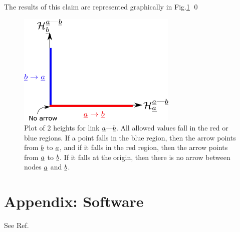 \documentclass[12pt]{article}
\newcommand{\linkab }[0]{{\rva\text{---}\rvb}}
\begin{document}
The results of this claim
are represented graphically in 
Fig.\ref{fig-heights-x-y}
\qed
\begin{figure}[h!]
\centering
\includegraphics[width=3in]
{heights-x-y.png}
\caption{Plot of 2 heights 
for link $\linkab$.
All allowed values 
fall in the
red or blue regions.
If a point falls in
the blue region, then the arrow 
points from ${\underline{b}}$ to ${\underline{a}}$,
and if it falls in the red region,
then
the arrow points from ${\underline{a}}$ to ${\underline{b}}$.
If it falls at the origin, then
there is no arrow between 
nodes ${\underline{a}}$ and ${\underline{b}}$. }
\label{fig-heights-x-y}
\end{figure}

\section{Appendix: Software}
See Ref.\cite{dag-lie-detector}




\end{document}
